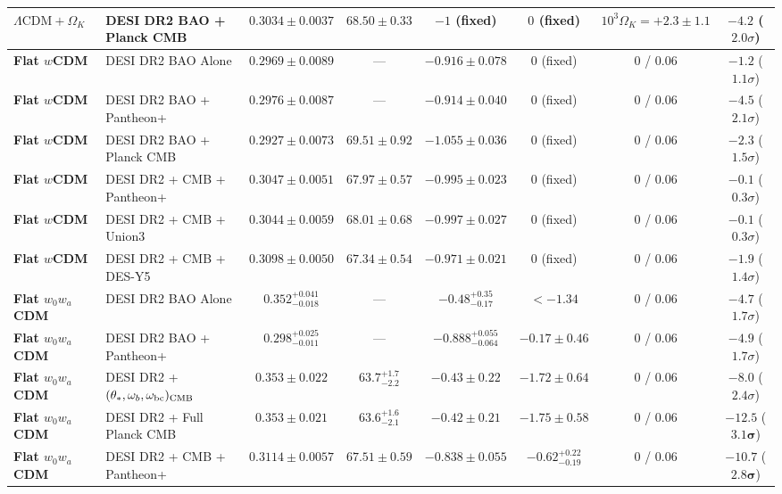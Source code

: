 \documentclass[aps,prd,preprint,superscriptaddress,nofootinbib]{revtex4-2}
\begin{document}
\begin{table}[!htbp]
{\begin{tabular}{llcccccc}
\textbf{$\Lambda\text{CDM} + \Omega_K$} & DESI DR2 BAO + Planck CMB & $0.3034 \pm 0.0037$ & $68.50 \pm 0.33$ & $-1$ (fixed) & $0$ (fixed) & $10^3\Omega_K = +2.3 \pm 1.1$ & $-4.2$ ($2.0\sigma$) \\
\midrule
\textbf{Flat $w$CDM} & DESI DR2 BAO Alone & $0.2969 \pm 0.0089$ & --- & $-0.916 \pm 0.078$ & $0$ (fixed) & $0$ / $0.06$ & $-1.2$ ($1.1\sigma$) \\
\textbf{Flat $w$CDM} & DESI DR2 BAO + Pantheon+ & $0.2976 \pm 0.0087$ & --- & $-0.914 \pm 0.040$ & $0$ (fixed) & $0$ / $0.06$ & $-4.5$ ($2.1\sigma$) \\
\textbf{Flat $w$CDM} & DESI DR2 BAO + Planck CMB & $0.2927 \pm 0.0073$ & $69.51 \pm 0.92$ & $-1.055 \pm 0.036$ & $0$ (fixed) & $0$ / $0.06$ & $-2.3$ ($1.5\sigma$) \\
\textbf{Flat $w$CDM} & DESI DR2 + CMB + Pantheon+ & $0.3047 \pm 0.0051$ & $67.97 \pm 0.57$ & $-0.995 \pm 0.023$ & $0$ (fixed) & $0$ / $0.06$ & $-0.1$ ($0.3\sigma$) \\
\textbf{Flat $w$CDM} & DESI DR2 + CMB + Union3 & $0.3044 \pm 0.0059$ & $68.01 \pm 0.68$ & $-0.997 \pm 0.027$ & $0$ (fixed) & $0$ / $0.06$ & $-0.1$ ($0.3\sigma$) \\
\textbf{Flat $w$CDM} & DESI DR2 + CMB + DES-Y5 & $0.3098 \pm 0.0050$ & $67.34 \pm 0.54$ & $-0.971 \pm 0.021$ & $0$ (fixed) & $0$ / $0.06$ & $-1.9$ ($1.4\sigma$) \\
\midrule
\textbf{Flat $w_0 w_a$CDM} & DESI DR2 BAO Alone & $0.352^{+0.041}_{-0.018}$ & --- & $-0.48^{+0.35}_{-0.17}$ & $< -1.34$ & $0$ / $0.06$ & $-4.7$ ($1.7\sigma$) \\
\textbf{Flat $w_0 w_a$CDM} & DESI DR2 BAO + Pantheon+ & $0.298^{+0.025}_{-0.011}$ & --- & $-0.888^{+0.055}_{-0.064}$ & $-0.17 \pm 0.46$ & $0$ / $0.06$ & $-4.9$ ($1.7\sigma$) \\
\textbf{Flat $w_0 w_a$CDM} & DESI DR2 + $(\theta_*,\omega_b,\omega_{\rm bc})_{\rm CMB}$ & $0.353 \pm 0.022$ & $63.7^{+1.7}_{-2.2}$ & $-0.43 \pm 0.22$ & $-1.72 \pm 0.64$ & $0$ / $0.06$ & $-8.0$ ($2.4\sigma$) \\
\textbf{Flat $w_0 w_a$CDM} & DESI DR2 + Full Planck CMB & $0.353 \pm 0.021$ & $63.6^{+1.6}_{-2.1}$ & $-0.42 \pm 0.21$ & $-1.75 \pm 0.58$ & $0$ / $0.06$ & $-12.5$ ($\mathbf{3.1}\boldsymbol{\sigma}$) \\
\textbf{Flat $w_0 w_a$CDM} & DESI DR2 + CMB + Pantheon+ & $0.3114 \pm 0.0057$ & $67.51 \pm 0.59$ & $-0.838 \pm 0.055$ & $-0.62^{+0.22}_{-0.19}$ & $0$ / $0.06$ & $-10.7$ ($\mathbf{2.8}\boldsymbol{\sigma}$) \\

\end{tabular}}
\end{table}
\end{document}
